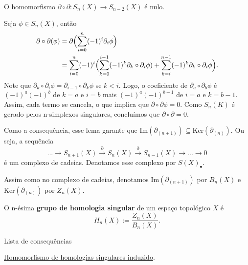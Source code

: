 \begin{lemma}
    O homomorfismo $\partial\circ \partial:S_n(X)\rightarrow S_{n-2}(X)$ é nulo.
\end{lemma}

\begin{dem}
    Seja $\phi\in S_n(X)$, então 
    \begin{align*}
        \partial\circ \partial(\phi)&=\partial\Bigl(\sum_{i=0}^n (-1)^i \partial_i\phi \Bigr) \\
        &=\sum_{i=0}^n (-1)^i  \Bigl( \sum_{k=0}^{i-1}(-1)^k \partial_k\circ\partial_i \phi)+\sum_{k=i}^{n-1} (-1)^k\partial_{k}\circ\partial_i \phi  \Bigr).
    \end{align*}
    Note que $\partial_k\circ\partial_i\phi=\partial_{i-1}\circ\partial_k \phi$ se $k<i$. Logo, o coeficiente de $\partial_a\circ\partial_b \phi$ é $(-1)^a(-1)^b$ de $k=a$ e $i=b$ mais $(-1)^a(-1)^{b-1}$ de $i=a$ e $k=b-1$. Assim, cada termo se cancela, o que implica que $\partial\circ\partial\phi=0$. Como $S_n(K)$ é gerado pelos n-simplexos singulares, concluímos que $\partial\circ\partial=0$.
\end{dem}

Como a consequência, esse lema garante que $\text{Im}(\partial_{(n+1)})\subseteq \text{Ker}(\partial_{(n)})$. Ou seja, a sequência 
\[...\rightarrow S_{n+1}(X)\xrightarrow{\partial}S_n(X)\xrightarrow{\partial} S_{n-1}(X)\rightarrow...\rightarrow 0\]
é um complexo de cadeias. Denotamos esse complexo por $S(X)_\bullet$.

Assim como no complexo de cadeias, denotamos $\text{Im}(\partial_{(n+1)})$ por $B_n(X)$ e $\text{Ker}(\partial_{(n)})$ por $Z_n(X)$.

\begin{defi}
    O n-ésima \textbf{grupo de homologia singular} de um espaço topológico $X$ é 
    \[H_n(X):=\frac{Z_n(X)}{B_n(X)}.\]
\end{defi}

\begin{titlemize}{Lista de consequências}
    \item \hyperref[homomorfismo-de-homologias-singulares-induzido-prop]{Homomorfismo de homologias singulares induzido}.\\ %
\end{titlemize}
